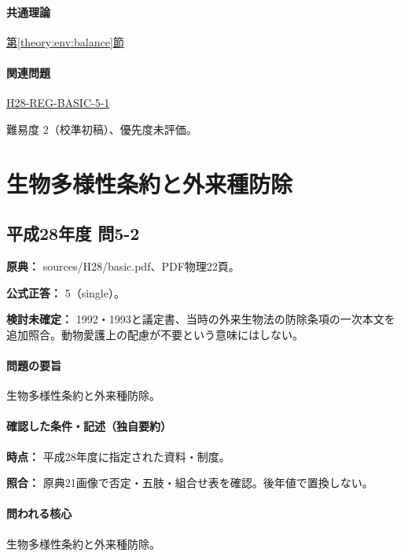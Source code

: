 \paragraph{共通理論} \hyperref[theory:env:balance]{第\ref*{theory:env:balance}節}

\paragraph{関連問題} \hyperref[q:h28-reg-basic-5-1]{H28-REG-BASIC-5-1}

\par 難易度 2（校準初稿）、優先度未評価。

\section{生物多様性条約と外来種防除}

\subsection{平成28年度 問5-2}
\label{q:h28-reg-basic-5-2}

\noindent\textbf{原典：} sources/H28/basic.pdf、PDF物理22頁。

\textbf{公式正答：} 5（single）。

\par\textbf{検討未確定：} 1992・1993と議定書、当時の外来生物法の防除条項の一次本文を追加照合。動物愛護上の配慮が不要という意味にはしない。

\paragraph{問題の要旨} 生物多様性条約と外来種防除。

\paragraph{確認した条件・記述（独自要約）}\mbox{}\par

\noindent\textbf{時点：} 平成28年度に指定された資料・制度。\par

\noindent\textbf{照合：} 原典21画像で否定・五肢・組合せ表を確認。後年値で置換しない。\par

\paragraph{問われる核心} 生物多様性条約と外来種防除。

